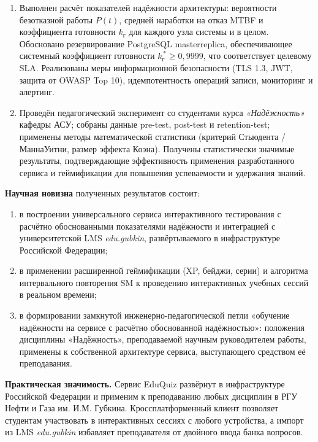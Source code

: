 \begin{enumerate}[label=\arabic*., noitemsep]
    \item Выполнен расчёт показателей надёжности архитектуры:
          вероятности безотказной работы $P(t)$, средней наработки
          на отказ MTBF и коэффициента готовности $k_{\text{г}}$
          для каждого узла системы и в целом. Обосновано
          резервирование PostgreSQL master\textendash replica,
          обеспечивающее системный коэффициент готовности
          $k_{\text{г}}^{\,*} \geq 0{,}9999$, что соответствует
          целевому SLA. Реализованы меры информационной
          безопасности (TLS 1.3, JWT, защита от OWASP Top 10),
          идемпотентность операций записи, мониторинг и алертинг.

    \item Проведён педагогический эксперимент со студентами курса
          \textit{«Надёжность»} кафедры АСУ; собраны данные
          pre-test, post-test и retention-test;
          применены методы математической статистики (критерий
          Стьюдента / Манна\textendash Уитни, размер эффекта Коэна).
          Получены статистически значимые результаты, подтверждающие
          эффективность применения разработанного сервиса
          и геймификации для повышения успеваемости и удержания
          знаний.
\end{enumerate}

\textbf{Научная новизна} полученных результатов состоит:
\begin{enumerate}[label=\arabic*., noitemsep]
    \item в построении универсального сервиса интерактивного
          тестирования с расчётно обоснованными показателями
          надёжности и интеграцией с университетской LMS
          \textit{edu.gubkin}, развёртываемого в инфраструктуре
          Российской Федерации;
    \item в применении расширенной геймификации (XP, бейджи,
          серии) и алгоритма интервального повторения SM
          к проведению интерактивных учебных сессий в реальном
          времени;
    \item в формировании замкнутой инженерно-педагогической петли
          «обучение надёжности на сервисе с расчётно обоснованной
          надёжностью»: положения дисциплины «Надёжность»,
          преподаваемой научным руководителем работы, применены
          к собственной архитектуре сервиса, выступающего средством
          её преподавания.
\end{enumerate}

\textbf{Практическая значимость.}
Сервис EduQuiz развёрнут в инфраструктуре Российской Федерации
и применим к преподаванию любых дисциплин в РГУ Нефти и Газа
им. И.М. Губкина. Кроссплатформенный клиент позволяет студентам
участвовать в интерактивных сессиях с любого устройства, а импорт
из LMS \textit{edu.gubkin} избавляет преподавателя от двойного
ввода банка вопросов.

